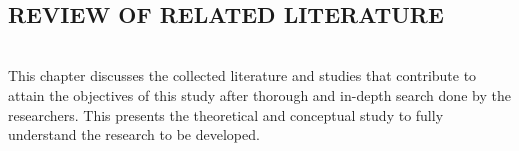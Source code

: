 \leavevmode\\

\begin{doublespace}
	\begin{center}
		\section*{REVIEW OF RELATED LITERATURE}
	\end{center}

	\leavevmode\\

	\justifying
	This chapter discusses the collected literature and studies that contribute to
	attain the objectives of this study after thorough and in-depth search done by
	the researchers. This presents the theoretical and conceptual study to fully
	understand the research to be developed.

	
	
	
	
	
	
	
	

	
	
	
	
	
	
	

	
	

	
	
	
	
	

\end{doublespace}
